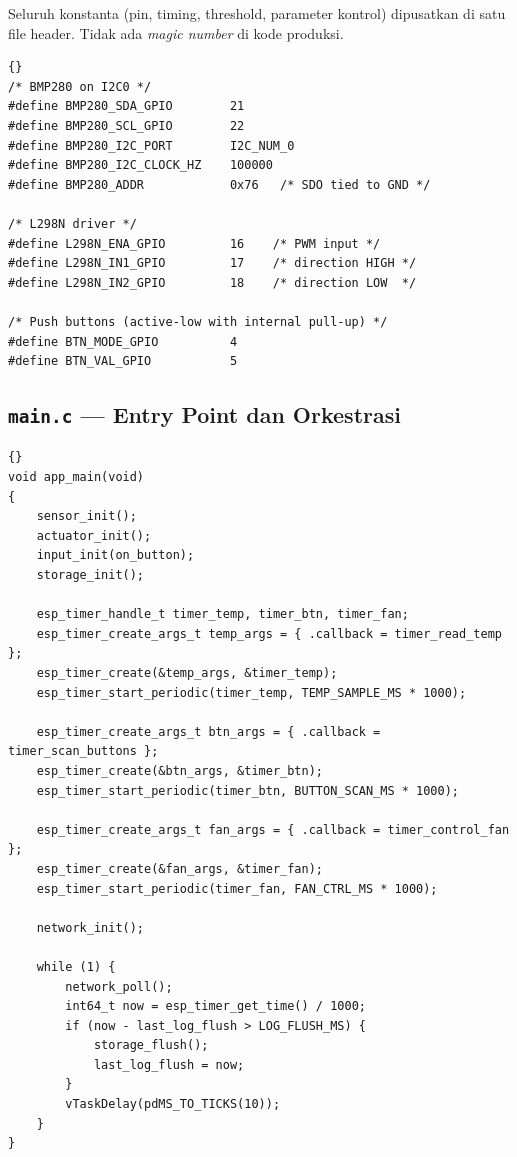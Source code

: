 \documentclass[11pt,a4paper]{article}
\begin{document}
Seluruh konstanta (pin, timing, threshold, parameter kontrol) dipusatkan di satu file header. Tidak ada \emph{magic number} di kode produksi.

\begin{lstlisting}[caption={Cuplikan \texttt{config.h} --- pin I2C BMP280}]{}
/* BMP280 on I2C0 */
#define BMP280_SDA_GPIO        21
#define BMP280_SCL_GPIO        22
#define BMP280_I2C_PORT        I2C_NUM_0
#define BMP280_I2C_CLOCK_HZ    100000
#define BMP280_ADDR            0x76   /* SDO tied to GND */

/* L298N driver */
#define L298N_ENA_GPIO         16    /* PWM input */
#define L298N_IN1_GPIO         17    /* direction HIGH */
#define L298N_IN2_GPIO         18    /* direction LOW  */

/* Push buttons (active-low with internal pull-up) */
#define BTN_MODE_GPIO          4
#define BTN_VAL_GPIO           5
\end{lstlisting}

\subsection{\texttt{main.c} --- Entry Point dan Orkestrasi}

\begin{lstlisting}[caption={\texttt{app\_main} --- bootstrap dan super-loop}]{}
void app_main(void)
{
    sensor_init();
    actuator_init();
    input_init(on_button);
    storage_init();

    esp_timer_handle_t timer_temp, timer_btn, timer_fan;
    esp_timer_create_args_t temp_args = { .callback = timer_read_temp };
    esp_timer_create(&temp_args, &timer_temp);
    esp_timer_start_periodic(timer_temp, TEMP_SAMPLE_MS * 1000);

    esp_timer_create_args_t btn_args = { .callback = timer_scan_buttons };
    esp_timer_create(&btn_args, &timer_btn);
    esp_timer_start_periodic(timer_btn, BUTTON_SCAN_MS * 1000);

    esp_timer_create_args_t fan_args = { .callback = timer_control_fan };
    esp_timer_create(&fan_args, &timer_fan);
    esp_timer_start_periodic(timer_fan, FAN_CTRL_MS * 1000);

    network_init();

    while (1) {
        network_poll();
        int64_t now = esp_timer_get_time() / 1000;
        if (now - last_log_flush > LOG_FLUSH_MS) {
            storage_flush();
            last_log_flush = now;
        }
        vTaskDelay(pdMS_TO_TICKS(10));
    }
}
\end{lstlisting}
\end{document}

